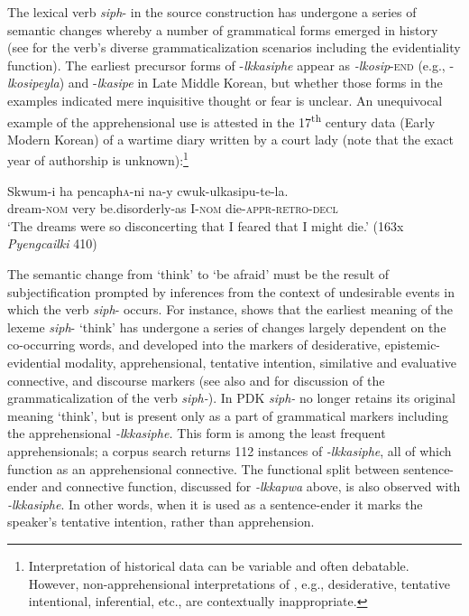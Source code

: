 \documentclass[output=paper,colorlinks,citecolor=brown]{langscibook}
\begin{document}
The lexical verb \textit{siph}- in the source construction has undergone a series of semantic changes whereby a number of grammatical forms emerged in history (see \citealt{Kim2010,Rhee2021a,Rheeforthcoming} for the verb's diverse grammaticalization scenarios including the evidentiality function). The earliest precursor forms of \nobreakdash-\textit{lkkasiphe} appear as \textit{-lkosip}-\textsc{end} (e.g., \nobreakdash-\textit{lkosipeyla}) and \nobreakdash-\textit{lkasipe} in Late Middle Korean, but whether those forms in the examples indicated mere inquisitive thought or fear is unclear. An unequivocal example of the apprehensional use is attested in the 17\textsuperscript{th} century data (Early Modern Korean) of a wartime diary written by a court lady (note that the exact year of authorship is unknown):\footnote{Interpretation of historical data can be variable and often debatable. However, non-apprehensional interpretations of , e.g., desiderative, tentative intentional, inferential, etc., are contextually inappropriate.}   



\ea \label{ex:RK9}
\gll Skwum-i ha pencaph\textsc{a}-ni na-y cwuk-ulkasipu-te-la. \\
dream-\textsc{nom} very be.disorderly-as I-\textsc{nom} die-\textsc{appr}-\textsc{retro}-\textsc{decl} \\
\glt `The dreams were so disconcerting that I feared that I might die.' (163x \textit{Pyengcailki} 410)
\z



 The semantic change from `think' to `be afraid' must be the result of subjectification prompted by inferences from the context of undesirable events in which the verb \textit{siph}- occurs. For instance, \citet{Rheeforthcoming} shows that the earliest meaning of the lexeme \textit{siph}- `think' has undergone a series of changes largely dependent on the co-occurring words, and developed into the markers of desiderative, epistemic-evidential modality, apprehensional, tentative intention, similative and evaluative connective, and discourse markers (see also \citealt{Kim2010} and \citealt{Rhee2021a} for discussion of the grammaticalization of the verb \textit{siph-}). In PDK \textit{siph-} no longer retains its original meaning `think', but is present only as a part of grammatical markers including the apprehensional \textit{-lkkasiphe.} This form is  among the least frequent apprehensionals; a corpus search returns 112 instances of \textit{\nobreakdash-lkkasiphe}, all of which function as an apprehensional connective. The functional split between sentence-ender and connective function, discussed for \textit{-lkkapwa} above, is also observed with \textit{-lkkasiphe}. In other words, when it is used as a sentence-ender it marks the speaker's tentative intention, rather than apprehension. 
\end{document}
